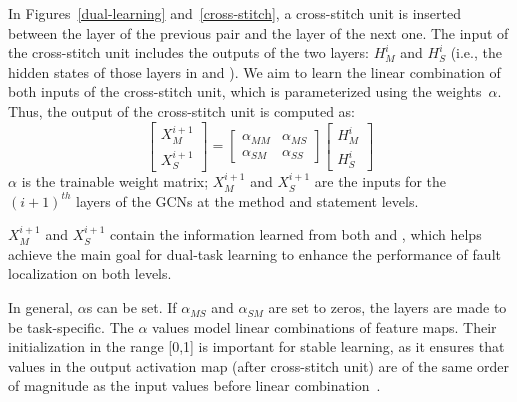 In Figures~\ref{dual-learning} and~\ref{cross-stitch}, a cross-stitch
unit is inserted between the  layer of the previous pair
and the  layer of the next one. The input of the
cross-stitch unit includes the outputs of the two  layers:
$H_M^i$ and $H_S^i$ (i.e., the hidden states of those layers in
 and ). We aim to learn the linear
combination of both inputs of the cross-stitch unit, which is
parameterized using the weights~$\alpha$.
%
Thus, the output of the cross-stitch unit is computed as:
\begin{equation}\label{cross-stitch-formula}
	\begin{bmatrix}
		X_M^{i+1}\\
		X_S^{i+1}
	\end{bmatrix}
        =
        \begin{bmatrix}
		\alpha_{MM} &  \alpha_{MS} \\
		\alpha_{SM} &  \alpha_{SS}
	\end{bmatrix}
	\begin{bmatrix}
		H_M^{i}\\
		H_S^{i}
	\end{bmatrix}
\end{equation}
$\alpha$ is the trainable weight matrix; $X_M^{i+1}$ and
$X_S^{i+1}$ are the inputs for the $(i+1)^{th}$ layers of the GCNs at the
method and statement levels.

$X_M^{i+1}$ and $X_S^{i+1}$ contain the information learned from both
 and , which helps achieve the main goal for
dual-task learning to enhance the performance of fault localization on both
levels.

In general, $\alpha$s can be set. If $\alpha_{MS}$ and $\alpha_{SM}$
are set to zeros, the layers are made to be task-specific.  The
$\alpha$ values model linear combinations of feature maps. Their
initialization in the range [0,1] is important for stable learning, as
it ensures that values in the output activation map (after
cross-stitch unit) are of the same order of magnitude as the input
values before linear combination~\cite{misra2016cross}.





